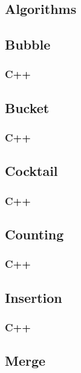 \documentclass{article}
\begin{document}
\newpage
\begin{appendices}
\section{Algorithms}
\subsection{Bubble}
\label{code:bubble}
\subsubsection{C++}

\newpage
\subsection{Bucket}
\label{code:bucket}
\subsubsection{C++}

\newpage
\subsection{Cocktail}
\label{code:cocktail}
\subsubsection{C++}

\newpage
\subsection{Counting}
\label{code:counting}
\subsubsection{C++}

\newpage
\subsection{Insertion}
\label{code:insertion}
\subsubsection{C++}

\newpage
\subsection{Merge}
\label{code:merge}

\end{appendices}
\end{document}
